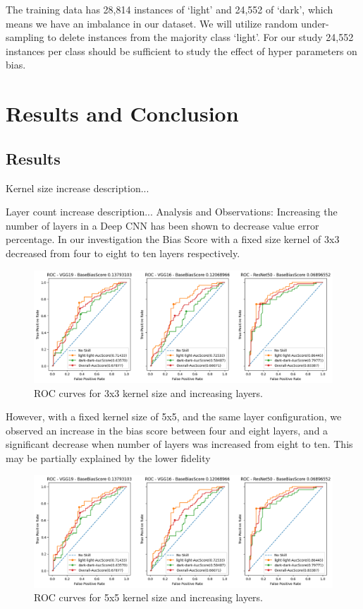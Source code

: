 \documentclass[conference]{IEEEtran}
\begin{document}
The training data has 28,814 instances of ‘light’ and 24,552 of ‘dark’, which means we have an imbalance in our dataset. We will utilize random under-sampling to delete instances from the majority class ‘light’. For our study 24,552 instances per class should be sufficient to study the effect of hyper parameters on bias.

\section{Results and Conclusion}
\subsection{Results}
Kernel size increase description...

Layer count increase description...
Analysis and Observations:
Increasing the number of layers in a Deep CNN has been shown to decrease value error percentage\cite{simonyan2014very}. 
In our investigation the Bias Score with a fixed size kernel of 3x3 decreased from four to eight to ten layers respectively.

\begin{figure}[hbt!]
    \centerline{\includegraphics[width=0.8\linewidth]{latex/images/VGG19_VGG16_ResNet50.png}}
    \caption{ROC curves for 3x3 kernel size and increasing layers.}
    \label{binarized_data}
\end{figure}

However, with a fixed kernel size of 5x5, and the same layer configuration, we observed an increase in the bias score between four and eight layers, and a significant decrease when number of layers was increased from eight to ten. This may be partially explained by the lower fidelity 

\begin{figure}[hbt!]
    \centerline{\includegraphics[width=1\linewidth]{latex/images/VGG19_VGG16_ResNet50.png}}
    \caption{ROC curves for 5x5 kernel size and increasing layers.}
    \label{binarized_data}
\end{figure}
\end{document}
